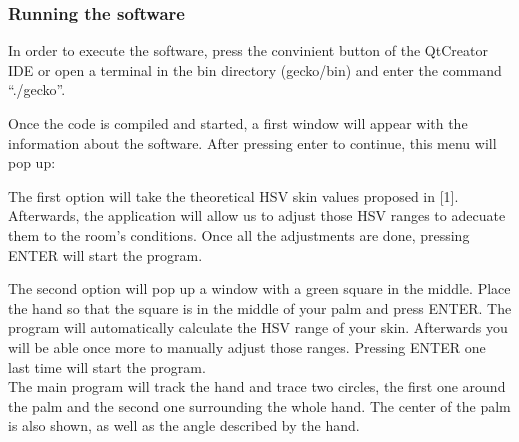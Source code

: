 \subsubsection{Running the software}

In order to execute the software, press the convinient button of the QtCreator IDE or open a terminal in the bin directory (gecko/bin) and enter the command ``./gecko''. 

Once the code is compiled and started, a first window will appear with the information about the software. After pressing enter to continue, this menu will pop up: 
\begin{center}
\end{center}

\vspace{1cm}
The first option will take the theoretical HSV skin values proposed in [1]. Afterwards, the application will allow us to adjust those HSV ranges to adecuate them to the room's conditions. 
Once all the adjustments are done, pressing ENTER will start the program. 

The second option will pop up a window with a green square in the middle. Place the hand so that the square is in the middle of your palm and press ENTER. The program will automatically calculate the HSV range of your skin. Afterwards you will be able once more to manually adjust those ranges. Pressing ENTER one last time will start the program. 
\\
 
The main program will track the hand and trace two circles, the first one around the palm and the second one surrounding the whole hand. The center of the palm is also shown, as well as the angle described by the hand. 

